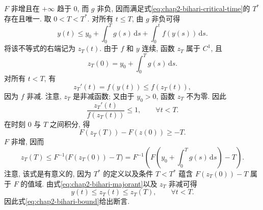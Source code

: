 \begin{Proof}
$F$ 非增且在 $+\infty$ 趋于 $0$, 而 $g$ 非负, 因而满足式\eqref{eq:chap2-bihari-critical-time}的 $T^*$ 存在且唯一. 取 $0<T<T^*$. 对所有 $t\leq T$, 由 $g$ 非负可得
\begin{equation}
 y(t)\leq y_0+\int_0^Tg(s)\,\mathrm{d}s
 +\int_0^t f(y(s))\,\mathrm{d}s.
 \label{eq:chap2-bihari-majorant}
\end{equation}
将该不等式的右端记为 $z_T(t)$. 由于 $f$ 和 $y$ 连续, 函数 $z_T$ 属于 $C^1$, 且
\[
 z_T(0)=y_0+\int_0^Tg(s)\,\mathrm{d}s.
\]
对所有 $t<T$, 有
\[
 z_T'(t)=f(y(t))\leq f(z_T(t)),
\]
因为 $f$ 非减. 注意, $z_T$ 是非减函数; 又由于 $y_0>0$, 函数 $z_T$ 不为零. 因此
\[
 \frac{z_T'(t)}{f(z_T(t))}\leq1,
 \qquad\forall t<T.
\]
在时刻 $0$ 与 $T$ 之间积分, 得
\[
 F(z_T(T))-F(z(0))\geq-T.
\]
$F$ 非增, 因而
\begin{equation}
 z_T(T)\leq F^{-1}\bigl(F(z_T(0))-T\bigr)
 =F^{-1}\left(F\left(y_0+\int_0^Tg(s)\,\mathrm{d}s\right)-T\right).
 \label{eq:chap2-bihari-bound}
\end{equation}
注意, 该式是有意义的, 因为 $T^*$ 的定义以及条件 $T<T^*$ 蕴含 $F(z_T(0))-T$ 属于 $F$ 的值域. 由式\eqref{eq:chap2-bihari-majorant}以及 $z_T$ 非减可得
\[
 y(t)\leq z_T(t)\leq z_T(T),
 \qquad\forall t<T.
\]
因此式\eqref{eq:chap2-bihari-bound}给出断言.
\end{Proof}
